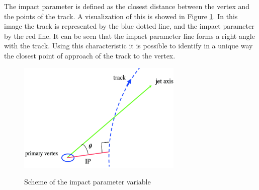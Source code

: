 The impact parameter is defined as the closest distance between the vertex and the points of the track. A visualization of this is showed in Figure \ref{Impact_parameter}. In this image the track is represented by the blue dotted line, and the impact parameter by the red line. It can be seen that the impact parameter line forms a right angle with the track. Using this characteristic it is possible to identify in a unique way the closest point of approach of the track to the vertex.


 \begin{figure}[h] 
 \centering
 \caption{Scheme of the impact parameter variable}
 \includegraphics[width=0.7\textwidth]{./Capitulos/VariableDefinitions/impactParameter}  
 \label{Impact_parameter}
 \end{figure} 

 
 
 
 
 
 
 
 
 
 
 
 
 
 
 
 
 
 
 